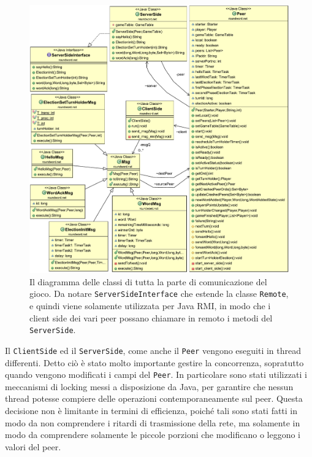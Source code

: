 \documentclass[10.5pt]{article}
\begin{document}
\begin{figure}
	\vspace*{-0.5in}
	\begin{center}
		\hspace*{-0.45in}
		\includegraphics[scale=0.75]{imgs/ClassDiagram2.pdf}
		\caption{Il diagramma delle classi di tutta la parte di comunicazione del gioco. Da notare \texttt{ServerSideInterface} che estende la classe \texttt{Remote}, e quindi viene solamente utilizzata per Java RMI, in modo che i client side dei vari peer possano chiamare in remoto i metodi del \texttt{ServerSide}.}\label{fig:class_diagram2}
	\end{center}
\end{figure}

Il \texttt{ClientSide} ed il \texttt{ServerSide}, come anche il \texttt{Peer} vengono eseguiti in thread differenti. Detto ciò è stato molto importante gestire la concorrenza, sopratutto quando vengono modificati i campi del \texttt{Peer}. In particolare sono stati utilizzati i meccanismi di locking messi a disposizione da Java, per garantire che nessun thread potesse compiere delle operazioni contemporaneamente sul peer. Questa decisione non è limitante in termini di efficienza, poiché tali sono stati fatti in modo da non comprendere i ritardi di trasmissione della rete, ma solamente in modo da comprendere solamente le piccole porzioni che modificano o leggono i valori del peer.
\end{document}
